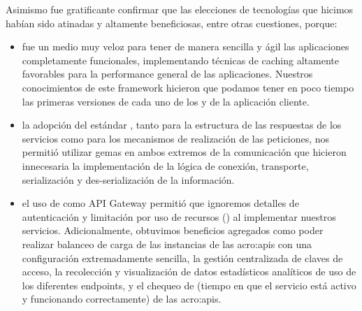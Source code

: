 Asimismo fue gratificante confirmar que las elecciones de tecnologías que hicimos habían sido atinadas y altamente beneficiosas, entre otras cuestiones, porque:

\begin{itemize}
  \item {} fue un medio muy veloz para tener de manera sencilla y ágil las aplicaciones completamente funcionales, implementando técnicas de caching altamente favorables para la performance general de las aplicaciones. Nuestros conocimientos de este framework hicieron que podamos tener en poco tiempo las primeras versiones de cada uno de los  y de la aplicación cliente.

  \item la adopción del estándar , tanto para la estructura de las respuestas de los servicios como para los mecanismos de realización de las peticiones, nos permitió utilizar gemas en ambos extremos de la comunicación que hicieron innecesaria la implementación de la lógica de conexión, transporte, serialización y des-serialización de la información.

  \item el uso de  como API Gateway permitió que ignoremos detalles de autenticación y limitación por uso de recursos () al implementar nuestros servicios. Adicionalmente, obtuvimos beneficios agregados como poder realizar balanceo de carga de las instancias de las \glspl{acro:api} con una configuración extremadamente sencilla, la gestión centralizada de claves de acceso, la recolección y visualización de datos estadísticos analíticos de uso de los diferentes endpoints, y el chequeo de  (tiempo en que el servicio está activo y funcionando correctamente) de las \glspl{acro:api}.
\end{itemize}

